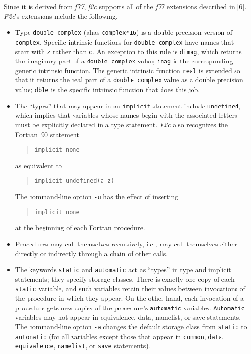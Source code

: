 \documentclass[12pt]{article}
\begin{document}
Since it is derived from \emph{f77}, \emph{f2c} supports all of the \emph{f77} extensions described in [6]. \emph{F2c}’s extensions include the following.
\begin{itemize}
\item Type \verb|double complex| (alias \verb|complex*16|) is a double-precision version of \verb|complex|. Specific intrinsic functions for \verb|double complex| have names that start with \verb|z| rather than \verb|c|. An exception to this rule is \verb|dimag|, which returns the imaginary part of a \verb|double complex| value; \verb|imag| is the corresponding generic intrinsic function. The generic intrinsic function \verb|real| is extended so that it returns the real part of a \verb|double complex| value as a double precision value; \verb|dble| is the specific intrinsic function that does this job.

\item The ``types'' that may appear in an \verb|implicit| statement include \verb|undefined|, which implies that variables whose names begin with the associated letters must be explicitly declared in a type statement. \emph{F2c} also recognizes the Fortran~90 statement
\begin{quote}
\begin{verbatim}
implicit none
\end{verbatim}
\end{quote}
as equivalent to
\begin{quote}
\begin{verbatim}
implicit undefined(a-z)
\end{verbatim}
\end{quote}
The command-line option \verb|-u| has the effect of inserting
\begin{quote}
\begin{verbatim}
implicit none
\end{verbatim}
\end{quote}
at the beginning of each Fortran procedure.

\item Procedures may call themselves recursively, i.e., may call themselves either directly or indirectly through a chain of other calls.

\item The keywords \verb|static| and \verb|automatic| act as ``types'' in type and implicit statements; they specify storage classes. There is exactly one copy of each \verb|static| variable, and such variables retain their values between invocations of the procedure in which they appear. On the other hand, each invocation of a procedure gets new copies of the procedure’s \verb|automatic| variables. \verb|Automatic| variables may not appear in equivalence, data, namelist, or save statements. The command-line option \verb|-a| changes the default storage class from \verb|static| to \verb|automatic| (for all variables except those that appear in \verb|common|, \verb|data|, \verb|equivalence|, \verb|namelist|, or \verb|save| statements).


\end{itemize}
\end{document}

